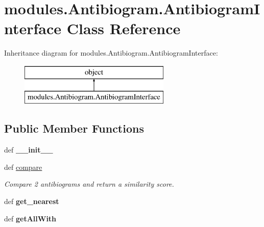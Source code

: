 \hypertarget{classmodules_1_1_antibiogram_1_1_antibiogram_interface}{\section{modules.\-Antibiogram.\-Antibiogram\-Interface Class Reference}
\label{classmodules_1_1_antibiogram_1_1_antibiogram_interface}
}
Inheritance diagram for modules.\-Antibiogram.\-Antibiogram\-Interface\-:\begin{figure}[H]
\begin{center}
\leavevmode
\includegraphics[height=2.000000cm]{classmodules_1_1_antibiogram_1_1_antibiogram_interface}
\end{center}
\end{figure}
\subsection*{Public Member Functions}
\begin{DoxyCompactItemize}
\item 
\hypertarget{classmodules_1_1_antibiogram_1_1_antibiogram_interface_acf7f7f84b58a3eaf772184992d2cf6ad}{def {\bfseries \-\_\-\-\_\-init\-\_\-\-\_\-}}\label{classmodules_1_1_antibiogram_1_1_antibiogram_interface_acf7f7f84b58a3eaf772184992d2cf6ad}

\item 
def \hyperlink{classmodules_1_1_antibiogram_1_1_antibiogram_interface_a2fcd9b412b44747b00c33d15965a41e1}{compare}
\begin{DoxyCompactList}\small\item\em Compare 2 antibiograms and return a similarity score. \end{DoxyCompactList}\item 
\hypertarget{classmodules_1_1_antibiogram_1_1_antibiogram_interface_ad7c66680e3c0aac68d95c8941b3566d0}{def {\bfseries get\-\_\-nearest}}\label{classmodules_1_1_antibiogram_1_1_antibiogram_interface_ad7c66680e3c0aac68d95c8941b3566d0}

\item 
\hypertarget{classmodules_1_1_antibiogram_1_1_antibiogram_interface_a0f892eca37d837c1a40cac5927c8aad3}{def {\bfseries get\-All\-With}}\label{classmodules_1_1_antibiogram_1_1_antibiogram_interface_a0f892eca37d837c1a40cac5927c8aad3}

\end{DoxyCompactItemize}
